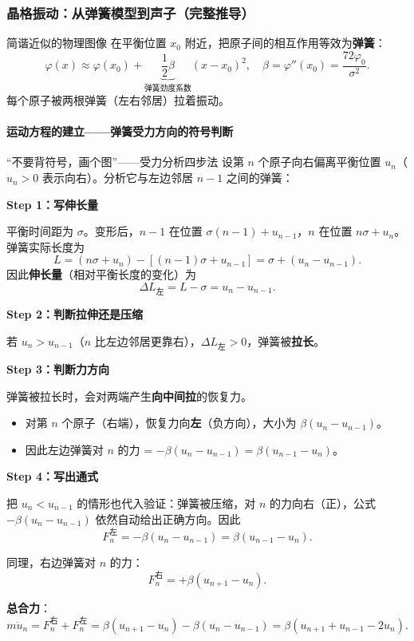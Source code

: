\subsubsection{晶格振动：从弹簧模型到声子（完整推导）}

\begin{insightbox}{简谐近似的物理图像}
在平衡位置 $x_0$ 附近，把原子间的相互作用等效为\textbf{弹簧}：
\[
  \varphi(x) \approx \varphi(x_0) + \underbrace{\frac{1}{2}\beta}_{\text{弹簧劲度系数}} (x-x_0)^2,
  \quad \beta = \varphi''(x_0) = \frac{72\varphi_0}{\sigma^2}.
\]
每个原子被两根弹簧（左右邻居）拉着振动。
\end{insightbox}

\paragraph{运动方程的建立——弹簧受力方向的符号判断}

\begin{modelbox}{``不要背符号，画个图''——受力分析四步法}
设第 $n$ 个原子向右偏离平衡位置 $u_n$（$u_n>0$ 表示向右）。分析它与左边邻居 $n-1$ 之间的弹簧：

\textbf{Step 1：写伸长量}

平衡时间距为 $\sigma$。变形后，$n-1$ 在位置 $\sigma(n-1)+u_{n-1}$，$n$ 在位置 $n\sigma+u_n$。弹簧实际长度为
\[
  L = (n\sigma+u_n) - [(n-1)\sigma+u_{n-1}] = \sigma + (u_n - u_{n-1}).
\]
因此\textbf{伸长量}（相对平衡长度的变化）为
\[
  \Delta L_{\text{左}} = L - \sigma = u_n - u_{n-1}.
\]

\textbf{Step 2：判断拉伸还是压缩}

若 $u_n > u_{n-1}$（$n$ 比左边邻居更靠右），$\Delta L_{\text{左}} > 0$，弹簧被\textbf{拉长}。

\textbf{Step 3：判断力方向}

弹簧被拉长时，会对两端产生\textbf{向中间拉}的恢复力。
\begin{itemize}[nosep]
  \item 对第 $n$ 个原子（右端），恢复力向\textbf{左}（负方向），大小为 $\beta(u_n-u_{n-1})$。
  \item 因此左边弹簧对 $n$ 的力 = $-\beta(u_n-u_{n-1}) = \beta(u_{n-1}-u_n)$。
\end{itemize}

\textbf{Step 4：写出通式}

把 $u_n < u_{n-1}$ 的情形也代入验证：弹簧被压缩，对 $n$ 的力向右（正），公式 $-\beta(u_n-u_{n-1})$ 依然自动给出正确方向。因此
\[
  \boxed{ F_{n}^{\text{左}} = -\beta(u_n - u_{n-1}) = \beta(u_{n-1}-u_n) }.
\]

同理，右边弹簧对 $n$ 的力：
\[
  \boxed{ F_{n}^{\text{右}} = +\beta(u_{n+1} - u_n) }.
\]

\textbf{总合力}：
\[
  m\ddot{u}_n = F_n^{\text{右}} + F_n^{\text{左}}
              = \beta(u_{n+1}-u_n) - \beta(u_n-u_{n-1})
              = \beta(u_{n+1} + u_{n-1} - 2u_n).
\]
\end{modelbox}

